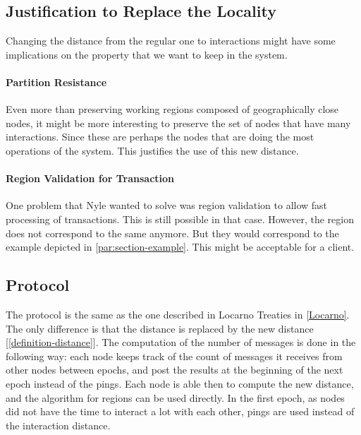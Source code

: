\documentclass[a4paper,11pt,twoside=semi,openright]{report}
\begin{document}
\subsection{Justification to Replace the Locality}
Changing the distance from the regular one to interactions might have some
implications on the property that we want to keep in the system. 

\paragraph{Partition Resistance}
Even more than preserving working regions
composed of geographically close nodes, it might be more interesting to preserve
the set of nodes that have many interactions. Since these are perhaps the nodes that are doing the most operations of the system. This justifies the use of
this new distance.

\paragraph{Region Validation for Transaction}
One problem that Nyle wanted to solve was region validation to allow fast
processing of transactions. This is still possible in that case. However, the
region does not correspond to the same anymore. But they would correspond to
the example depicted in \autoref{par:section-example}. This might be acceptable
for a client. 

\subsection{Protocol}
The protocol is the same as the one described in Locarno Treaties in
\autoref{Locarno}. The only difference is that the distance is replaced by the
new distance [\autoref{definition-distance}]. The computation of the number of
messages is done in the following way: each node keeps track of the count
of messages it receives from other nodes between epochs, and post the results
at the beginning of the next epoch instead of the pings. Each node is able then
to compute the new distance, and the algorithm for regions can be used
directly. In the first epoch, as nodes did not have the time to interact a lot
with each other, pings are used instead of the interaction distance.
\end{document}

